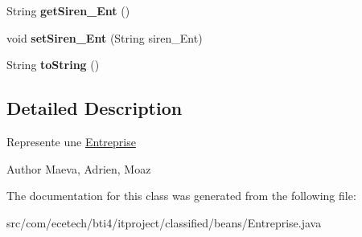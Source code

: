 \begin{DoxyCompactItemize}
\item 
String {\bfseries get\+Siren\+\_\+\+Ent} ()\hypertarget{classcom_1_1ecetech_1_1bti4_1_1itproject_1_1classified_1_1beans_1_1_entreprise_ac46b48fd3e1136b88ede50bb957a4f79}{}\label{classcom_1_1ecetech_1_1bti4_1_1itproject_1_1classified_1_1beans_1_1_entreprise_ac46b48fd3e1136b88ede50bb957a4f79}

\item 
void {\bfseries set\+Siren\+\_\+\+Ent} (String siren\+\_\+\+Ent)\hypertarget{classcom_1_1ecetech_1_1bti4_1_1itproject_1_1classified_1_1beans_1_1_entreprise_a87ede27dc581965c4c12436b07692bd2}{}\label{classcom_1_1ecetech_1_1bti4_1_1itproject_1_1classified_1_1beans_1_1_entreprise_a87ede27dc581965c4c12436b07692bd2}

\item 
String {\bfseries to\+String} ()\hypertarget{classcom_1_1ecetech_1_1bti4_1_1itproject_1_1classified_1_1beans_1_1_entreprise_a7a8adc9f3c5b1d83613168d1aff3e6db}{}\label{classcom_1_1ecetech_1_1bti4_1_1itproject_1_1classified_1_1beans_1_1_entreprise_a7a8adc9f3c5b1d83613168d1aff3e6db}

\end{DoxyCompactItemize}


\subsection{Detailed Description}
Represente une \hyperlink{classcom_1_1ecetech_1_1bti4_1_1itproject_1_1classified_1_1beans_1_1_entreprise}{Entreprise} \begin{DoxyAuthor}{Author}
Maeva, Adrien, Moaz 
\end{DoxyAuthor}


The documentation for this class was generated from the following file\+:\begin{DoxyCompactItemize}
\item 
src/com/ecetech/bti4/itproject/classified/beans/Entreprise.\+java\end{DoxyCompactItemize}
